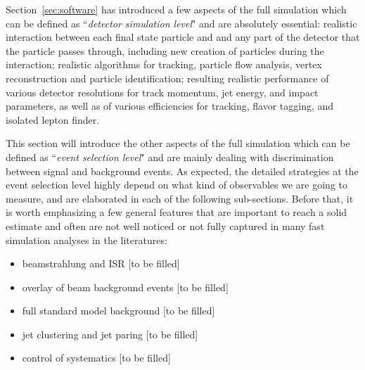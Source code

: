 Section~\ref{sec:software} has introduced a few aspects of the full simulation
which can be defined as ``{\it detector simulation level}" and are absolutely essential: 
realistic interaction between each final state particle and 
and any part of the detector that the particle passes through, including new creation of
particles during the interaction; realistic algorithms for tracking,
particle flow analysis, vertex reconstruction and particle identification; 
resulting realistic performance of various detector resolutions for track momentum, jet energy,
and impact parameters, as well as of various efficiencies for tracking, flavor tagging, 
and isolated lepton finder. 

This section will introduce the other aspects of the full simulation which can be
defined as ``{\it event selection level}" and are mainly dealing with discrimination 
between signal and background events. As expected, the detailed strategies 
at the event selection level highly depend on what kind of observables we are going to
measure, and are elaborated in each of the following sub-sections. Before that, it is worth
emphasizing a few general features that are important to reach a solid estimate
and often are not well noticed or not fully captured in 
many fast simulation analyses in the literatures:
\begin{itemize}
\item beamstrahlung and ISR
[to be filled]
\item overlay of beam background events
[to be filled]
\item full standard model background
[to be filled]
\item jet clustering and jet paring
[to be filled]
\item control of systematics 
[to be filled]
\end{itemize}

